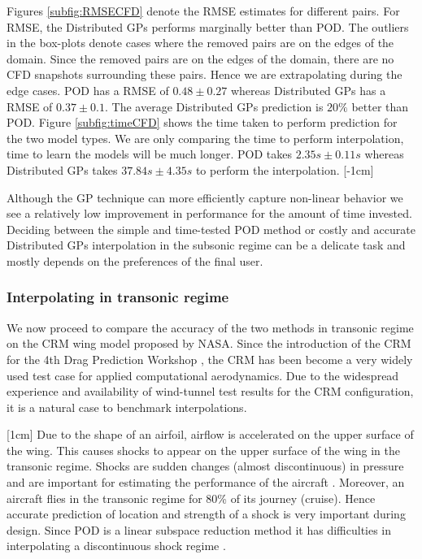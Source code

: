 Figures \ref{subfig:RMSECFD} denote the RMSE estimates for different pairs. For RMSE, the Distributed GPs performs marginally better than POD. The outliers in the box-plots denote cases where the removed pairs are on the edges of the domain. Since the removed pairs are on the edges of the domain, there are no CFD snapshots surrounding these pairs. Hence we are extrapolating during the edge cases. POD has a RMSE of $0.48\pm0.27$ whereas Distributed GPs has a RMSE of $0.37\pm0.1$. The average Distributed GPs prediction is $20\%$ better than POD. Figure \ref{subfig:timeCFD} shows the time taken to perform prediction for the two model types. We are only comparing the time to perform interpolation, time to learn the models will be much longer. POD takes $2.35s\pm0.11s$ whereas Distributed GPs takes $37.84s\pm4.35s$ to perform the interpolation.  
[-1cm]

Although the GP technique can more efficiently capture non-linear behavior we see a relatively low improvement in performance for the amount of time invested. Deciding between the simple and time-tested POD method or costly and accurate Distributed GPs interpolation in the subsonic regime can be a delicate task and mostly depends on the preferences of the final user.

\subsubsection{Interpolating in transonic regime}\label{subSec:resultsCRM}
We now proceed to compare the accuracy of the two methods in transonic regime on the CRM wing model proposed by NASA. Since the introduction of the CRM for the 4th Drag Prediction Workshop \cite{vassberg2014summary}, the CRM has been become a very widely used test case for applied computational aerodynamics. Due to the widespread experience and availability of wind-tunnel test results for the CRM configuration, it is a natural case to benchmark interpolations. 

[1cm]
Due to the shape of an airfoil, airflow is accelerated on the upper surface of the wing. This causes shocks to appear on the upper surface of the wing in the transonic regime. Shocks are sudden changes (almost discontinuous) in pressure and are important for estimating the performance of the aircraft \cite{jameson1974iterative, cole2012transonic}. Moreover, an aircraft flies in the transonic regime for 80\% of its journey (cruise). Hence accurate prediction of location and strength of a shock is very important during design. Since POD is a linear subspace reduction method it has difficulties in interpolating a discontinuous shock regime \cite{verveld2016reduced}.

